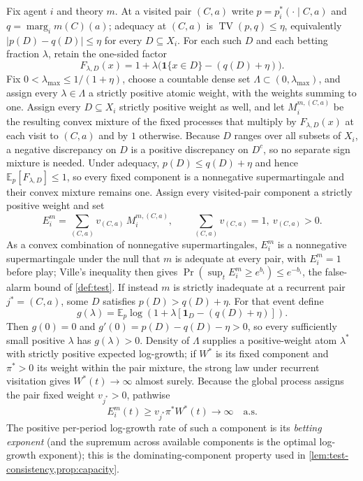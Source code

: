 \documentclass[11pt]{article}
\theoremstyle{definition}
\newcommand{\TV}{\operatorname{TV}}
\newcommand{\marg}[1]{\operatorname{marg}_{#1}}
\begin{document}
Fix agent $i$ and theory $m$.
At a visited pair $(C,a)$ write $p=p_i^{*}(\cdot\mid C,a)$ and $q=\marg{i}m(C)(a)$; adequacy at $(C,a)$ is $\TV(p,q)\le\eta$, equivalently $\lvert p(D)-q(D)\rvert\le\eta$ for every $D\subseteq X_i$.
For each such $D$ and each betting fraction $\lambda$, retain the one-sided factor
\[
F_{\lambda,D}(x)=1+\lambda\bigl(\mathbf 1\{x\in D\}-(q(D)+\eta)\bigr).
\]
Fix $0<\lambda_{\max}\le1/(1+\eta)$, choose a countable dense set $\Lambda\subset(0,\lambda_{\max})$, and assign every $\lambda\in\Lambda$ a strictly positive atomic weight, with the weights summing to one.
Assign every $D\subseteq X_i$ strictly positive weight as well, and let $M_i^{m,(C,a)}$ be the resulting convex mixture of the fixed processes that multiply by $F_{\lambda,D}(x)$ at each visit to $(C,a)$ and by $1$ otherwise.
Because $D$ ranges over all subsets of $X_i$, a negative discrepancy on $D$ is a positive discrepancy on $D^c$, so no separate sign mixture is needed.
Under adequacy, $p(D)\le q(D)+\eta$ and hence $\mathbb E_p[F_{\lambda,D}]\le1$, so every fixed component is a nonnegative supermartingale and their convex mixture remains one.
Assign every visited-pair component a strictly positive weight and set
\[
E_i^{m}=\sum_{(C,a)}v_{(C,a)}\,M_i^{m,(C,a)},
\qquad
\textstyle\sum_{(C,a)}v_{(C,a)}=1,\ v_{(C,a)}>0.
\]
As a convex combination of nonnegative supermartingales, $E_i^{m}$ is a nonnegative supermartingale under the null that $m$ is adequate at every pair, with $E_i^{m}=1$ before play; Ville's inequality then gives $\Pr(\sup_t E_i^{m}\ge e^{b_i})\le e^{-b_i}$, the false-alarm bound of \cref{def:test}.
If instead $m$ is strictly inadequate at a recurrent pair $j^{*}=(C,a)$, some $D$ satisfies $p(D)>q(D)+\eta$.
For that event define
\[
g(\lambda)=\mathbb E_p\log\!\left(1+\lambda[\mathbf 1_D-(q(D)+\eta)]\right).
\]
Then $g(0)=0$ and $g'(0)=p(D)-q(D)-\eta>0$, so every sufficiently small positive $\lambda$ has $g(\lambda)>0$.
Density of $\Lambda$ supplies a positive-weight atom $\lambda^{*}$ with strictly positive expected log-growth; if $W^{*}$ is its fixed component and $\pi^{*}>0$ its weight within the pair mixture, the strong law under recurrent visitation gives $W^{*}(t)\to\infty$ almost surely.
Because the global process assigns the pair fixed weight $v_{j^{*}}>0$, pathwise
\[
E_i^{m}(t)\ge v_{j^{*}}\pi^{*}W^{*}(t)\longrightarrow\infty\quad\text{a.s.}
\]
The positive per-period log-growth rate of such a component is its \emph{betting exponent} (and the supremum across available components is the optimal log-growth exponent); this is the dominating-component property used in \cref{lem:test-consistency,prop:capacity}.
\end{document}
